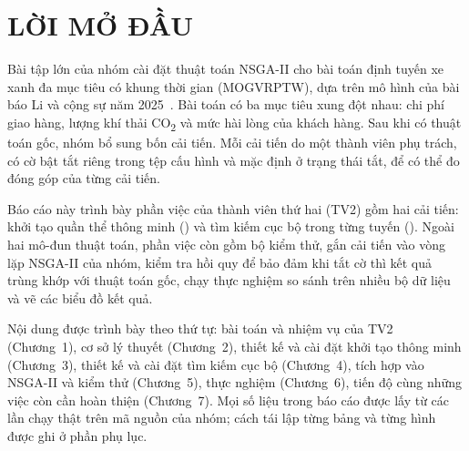\chapter*{LỜI MỞ ĐẦU}

Bài tập lớn của nhóm cài đặt thuật toán NSGA-II cho bài toán định tuyến xe xanh đa mục tiêu có khung
thời gian (MOGVRPTW), dựa trên mô hình của bài báo Li và cộng sự năm 2025~\cite{li2025}. Bài toán có ba mục tiêu xung
đột nhau: chi phí giao hàng, lượng khí thải CO\textsubscript{2} và mức hài lòng của khách hàng. Sau khi
có thuật toán gốc, nhóm bổ sung bốn cải tiến. Mỗi cải tiến do một thành viên phụ trách, có cờ bật tắt
riêng trong tệp cấu hình và mặc định ở trạng thái tắt, để có thể đo đóng góp của từng cải tiến.

Báo cáo này trình bày phần việc của thành viên thứ hai (TV2) gồm hai cải tiến: khởi tạo quần thể thông
minh () và tìm kiếm cục bộ trong từng tuyến (). Ngoài hai mô-đun
thuật toán, phần việc còn gồm bộ kiểm thử, gắn cải tiến vào vòng lặp NSGA-II của nhóm, kiểm tra hồi
quy để bảo đảm khi tắt cờ thì kết quả trùng khớp với thuật toán gốc, chạy thực nghiệm so sánh trên
nhiều bộ dữ liệu và vẽ các biểu đồ kết quả.

Nội dung được trình bày theo thứ tự: bài toán và nhiệm vụ của TV2 (Chương~1), cơ sở lý thuyết
(Chương~2), thiết kế và cài đặt khởi tạo thông minh (Chương~3), thiết kế và cài đặt tìm kiếm cục bộ
(Chương~4), tích hợp vào NSGA-II và kiểm thử (Chương~5), thực nghiệm (Chương~6), tiến độ cùng những
việc còn cần hoàn thiện (Chương~7). Mọi số liệu trong báo cáo được lấy từ các lần chạy thật trên mã
nguồn của nhóm; cách tái lập từng bảng và từng hình được ghi ở phần phụ lục.
